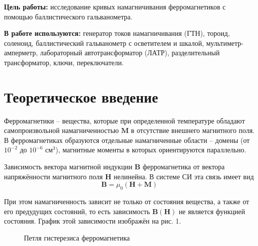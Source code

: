 \textbf{Цель работы:} исследование кривых намагничивания ферромагнетиков с помощью баллистического гальванометра.

\textbf{В работе используются:} генератор токов намагничивания (ГТН), тороид, соленоид, баллистический гальванометр с осветителем и шкалой, мультиметр-амперметр, лабораторный автотрансформатор (ЛАТР), разделительный трансформатор, ключи, переключатели.
                    
\section{Теоретическое введение}
	
Ферромагнетики -- вещества, которые при определенной температуре обладают самопроизвольной намагниченностью $\boldsymbol{M}$ в отсутствие внешнего магнитного поля. В ферромагнетиках образуются отдельные намагниченные области – домены (от $10^{-2}$ до $10^{-6}$ см$^3$), магнитные моменты в которых ориентируются параллельно.

Зависимость вектора магнитной индукции $\boldsymbol{B}$ ферромагнетика от вектора напряжённости магнитного поля $\boldsymbol{H}$ нелинейна. В системе СИ эта связь имеет вид
\begin{equation} 
    \label{eq:BM}
    \boldsymbol{B} = \mu_0(\boldsymbol{H} + \boldsymbol{M})
\end{equation}

При этом намагниченность зависит не только от состояния вещества, а также от его предудущих состояний, то есть зависимость $\boldsymbol{B}(\boldsymbol{H})$ не является функцией состояния. График этой зависимости изображён на рис. 1.

\begin{figure}[h!]
    \caption{Петля гистерезиса ферромагнетика}
    \label{ris:hysteresis}
\end{figure}

